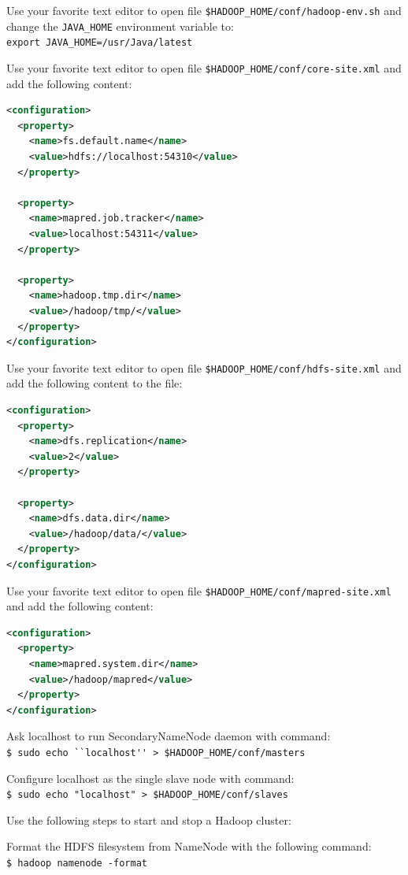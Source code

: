 Use your favorite text editor to open file \verb|$HADOOP_HOME/conf/hadoop-env.sh| and change the \verb|JAVA_HOME| environment variable to: \\
\verb|export JAVA_HOME=/usr/Java/latest|

Use your favorite text editor to open file \verb|$HADOOP_HOME/conf/core-site.xml| and add the following content:
\lstset{style=bashstyle}
\begin{lstlisting}[language=XML]
<configuration>
  <property>
    <name>fs.default.name</name>
    <value>hdfs://localhost:54310</value>
  </property>

  <property>
    <name>mapred.job.tracker</name>
    <value>localhost:54311</value>
  </property>

  <property>
    <name>hadoop.tmp.dir</name>
    <value>/hadoop/tmp/</value>
  </property>
</configuration>
\end{lstlisting}

Use your favorite text editor to open file \verb|$HADOOP_HOME/conf/hdfs-site.xml| and add the following content to the file:
\begin{lstlisting}[language=XML]
<configuration>
  <property>
    <name>dfs.replication</name>
    <value>2</value>
  </property>

  <property>
    <name>dfs.data.dir</name>
    <value>/hadoop/data/</value>
  </property>
</configuration>
\end{lstlisting}

Use your favorite text editor to open file \verb|$HADOOP_HOME/conf/mapred-site.xml| and add the following content:
\begin{lstlisting}[language=XML]
<configuration>
  <property>
    <name>mapred.system.dir</name>
    <value>/hadoop/mapred</value>
  </property>
</configuration>
\end{lstlisting}

Ask localhost to run SecondaryNameNode daemon with command: \\
\verb|$ sudo echo ``localhost'' > $HADOOP_HOME/conf/masters|

Configure localhost as the single slave node with command: \\
\verb|$ sudo echo "localhost" > $HADOOP_HOME/conf/slaves|

Use the following steps to start and stop a Hadoop cluster:

Format the HDFS filesystem from NameNode with the following command: \\
\verb|$ hadoop namenode -format|

